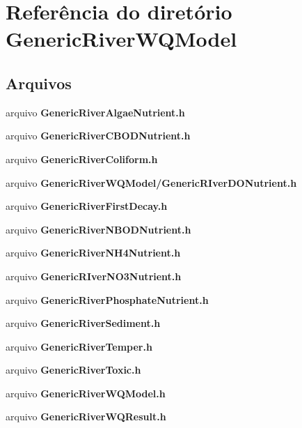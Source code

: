 \section{Referência do diretório Generic\+River\+W\+Q\+Model}
\label{dir_df4232e5cf4dec4c205d4e2e03e45a98}
\subsection*{Arquivos}
\begin{DoxyCompactItemize}
\item 
arquivo {\bf Generic\+River\+Algae\+Nutrient.\+h}
\item 
arquivo {\bf Generic\+River\+C\+B\+O\+D\+Nutrient.\+h}
\item 
arquivo {\bf Generic\+River\+Coliform.\+h}
\item 
arquivo {\bf Generic\+River\+W\+Q\+Model/\+Generic\+R\+Iver\+D\+O\+Nutrient.\+h}
\item 
arquivo {\bf Generic\+River\+First\+Decay.\+h}
\item 
arquivo {\bf Generic\+River\+N\+B\+O\+D\+Nutrient.\+h}
\item 
arquivo {\bf Generic\+River\+N\+H4\+Nutrient.\+h}
\item 
arquivo {\bf Generic\+R\+Iver\+N\+O3\+Nutrient.\+h}
\item 
arquivo {\bf Generic\+River\+Phosphate\+Nutrient.\+h}
\item 
arquivo {\bf Generic\+River\+Sediment.\+h}
\item 
arquivo {\bf Generic\+River\+Temper.\+h}
\item 
arquivo {\bf Generic\+River\+Toxic.\+h}
\item 
arquivo {\bf Generic\+River\+W\+Q\+Model.\+h}
\item 
arquivo {\bf Generic\+River\+W\+Q\+Result.\+h}
\end{DoxyCompactItemize}
